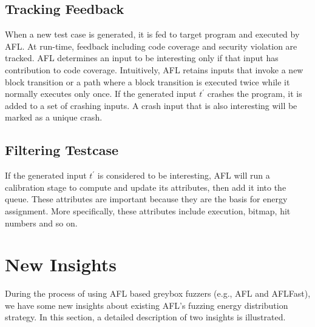 \subsection{Tracking Feedback}
When a new test case is generated, it is fed to target program and executed by AFL. At run-time, feedback including code coverage and security violation are tracked.  AFL determines an input to be interesting only if that input has contribution to code coverage. Intuitively, AFL retains inputs that invoke a new block transition or a path where a block transition is executed twice while it normally executes only once. If the generated input $t^{'}$ crashes the program, it is added to a set of crashing inputs. A crash input that is also interesting will be marked as a unique crash. 

\subsection{Filtering Testcase}
If the generated input $t^{'}$ is considered to be interesting, AFL will run a calibration stage to compute and update its attributes, then add it into the queue. These attributes are  important because they are the basis for energy assignment. More specifically, these attributes include execution, bitmap, hit numbers and so on.

\section{New Insights}\label{newinsight}
During the process of using AFL based greybox fuzzers (e.g., AFL and AFLFast), we have some new insights about existing AFL's fuzzing energy distribution strategy. In this section, a detailed description of two insights is illustrated.

